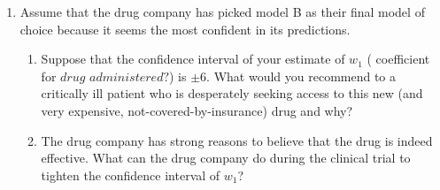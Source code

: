 \documentclass[submit]{harvardml}
\begin{document}
\begin{problem}
\begin{enumerate}
    \item Assume that the drug company has picked model B as their final model of choice because it seems the most confident in its predictions.
    \begin{enumerate}
        \item Suppose that the confidence interval of your estimate of $w_1$ ( coefficient for $drug$ $administered?$) is $\pm 6$. What would you recommend to a critically ill patient who is desperately seeking access to this new (and very expensive, not-covered-by-insurance) drug and why?
        \item The drug company has strong reasons to believe that the drug is indeed effective. What can the drug company do during the clinical trial to tighten the confidence interval of $w_1$?
    \end{enumerate}

\end{enumerate}
\end{problem}
\end{document}
